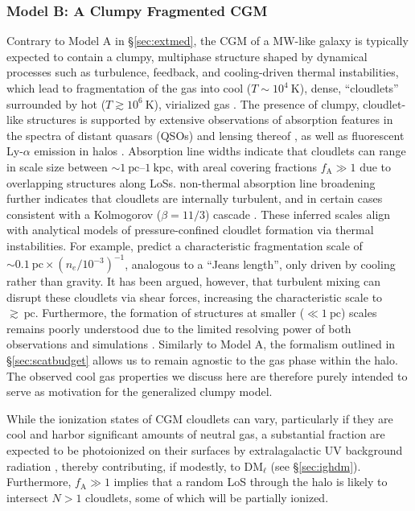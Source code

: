 \documentclass[twocolumn, linenumbers, tra]{aastex631}
\begin{document}
\subsubsection{\texorpdfstring{Model B: A {Clumpy Fragmented} CGM}{}}\label{sec:cloud}

{Contrary to Model A in \S\protect\ref{sec:extmed}, the CGM of a MW-like galaxy is typically expected to contain a clumpy, multiphase structure shaped by dynamical processes such as turbulence, feedback, and cooling-driven thermal instabilities, which lead to fragmentation of the gas into cool ($T \sim 10^4\ \mathrm{K}$), dense, ``cloudlets'' surrounded by hot ($T \gtrsim 10^6\ \mathrm{K}$), virialized gas \citep{Tumlinson2017, FaucherGiguere2023}. The presence of clumpy, cloudlet-like structures is supported by extensive observations of absorption features in the spectra of distant quasars (QSOs) and lensing thereof \citep{Lau2016}, as well as fluorescent Ly-$\alpha$ emission in halos \citep{Hennawi2015}. Absorption line widths indicate that cloudlets can range in scale size between $ \sim 1\ \mathrm{pc}$--$1\ \mathrm{kpc}$, with areal covering fractions $f_{\mathrm{A}} \gg 1$ due to overlapping structures along LoSs. non-thermal absorption line broadening further indicates that cloudlets are internally turbulent, and in certain cases consistent with a Kolmogorov ($\beta = 11/3$) cascade \citep{Chen2023, MChen2023}. These inferred scales align with analytical models of pressure-confined cloudlet formation via thermal instabilities. For example, \citet{McCourt2018} predict a characteristic fragmentation scale of $ \sim 0.1\ \mathrm{pc} \times (n_e/10^{-3})^{-1}$, analogous to a ``Jeans length'', only driven by cooling rather than gravity. It has been argued, however, that turbulent mixing can disrupt these cloudlets via shear forces, increasing the characteristic scale to $\gtrsim\ \mathrm{pc}$. Furthermore, the formation of structures at smaller ($\ll 1\ \mathrm{pc}$) scales remains poorly understood due to the limited resolving power of both observations and simulations \citep{Hummels2019, Butsky2024}. Similarly to Model A, the formalism outlined in \S\ref{sec:scatbudget} allows us to remain agnostic to the gas phase within the halo. The observed cool gas properties we discuss here are therefore purely intended to serve as motivation for the generalized clumpy model.

While the ionization states of CGM cloudlets can vary, particularly if they are cool and harbor significant amounts of neutral gas, a substantial fraction are expected to be photoionized on their surfaces by extralagalactic UV background radiation \citep{Werk2014}, thereby contributing, if modestly, to $\mathrm{DM}_\ell$ (see \S\ref{sec:ighdm}). Furthermore, $f_{\mathrm{A}} \gg 1$ implies that a random LoS through the halo is likely to intersect $N>1$ cloudlets, some of which will be partially ionized. 

}
\end{document}

